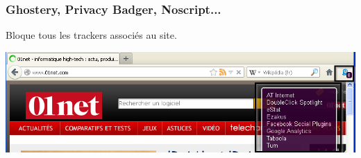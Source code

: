 \documentclass{beamer}
\begin{document}
\begin{frame}
\frametitle{Ghostery, Privacy Badger, Noscript...}
Bloque tous les trackers associés au site.
\begin{center}
\includegraphics[scale=0.4] {./images/Ghostery_tracker.png}
\end{center}
\end{frame}
\end{document}
